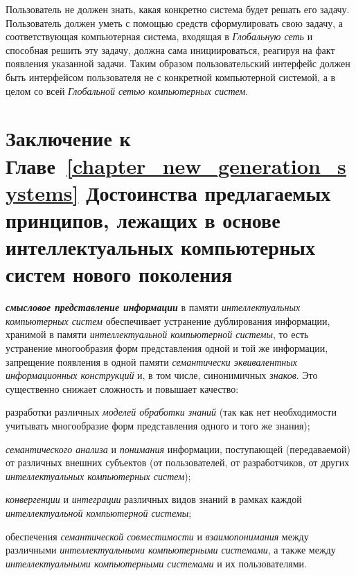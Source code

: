 Пользователь не должен знать, какая конкретно система будет решать его задачу. Пользователь должен уметь с помощью  средств сформулировать свою задачу, а соответствующая компьютерная система, входящая в \textit{Глобальную сеть} и способная решить эту задачу, должна сама инициироваться, реагируя на факт появления указанной задачи. Таким образом пользовательский интерфейс должен быть интерфейсом пользователя не с конкретной компьютерной системой, а в целом со всей \textit{Глобальной сетью компьютерных систем}.

\section*{Заключение к Главе~\ref{chapter_new_generation_systems} Достоинства предлагаемых принципов, лежащих в основе интеллектуальных компьютерных систем нового поколения}
\label{sec_ngics_advant}

\textbf{\textit{смысловое представление информации}} в памяти \textit{интеллектуальных компьютерных систем} обеспечивает устранение дублирования информации, хранимой в памяти \textit{интеллектуальной компьютерной системы}, то есть устранение многообразия форм представления одной и той же информации, запрещение появления в одной памяти \textit{семантически эквивалентных информационных конструкций} и, в том числе, синонимичных \textit{знаков}. Это существенно снижает сложность и повышает качество:

\begin{textitemize}
	\item разработки различных \textit{моделей обработки знаний} (так как нет необходимости учитывать многообразие форм представления одного и того же знания);
	\item \textit{семантического анализа} и \textit{понимания} информации, поступающей (передаваемой) от различных внешних субъектов (от пользователей, от разработчиков, от других \textit{интеллектуальных компьютерных систем});
	\item \textit{конвергенции} и \textit{интеграции} различных видов знаний в рамках каждой \textit{интеллектуальной компьютерной системы};
	\item обеспечения \textit{семантической совместимости} и \textit{взаимопонимания} между различными \textit{интеллектуальными компьютерными системами}, а также между \textit{интеллектуальными компьютерными системами} и их пользователями.
\end{textitemize}

